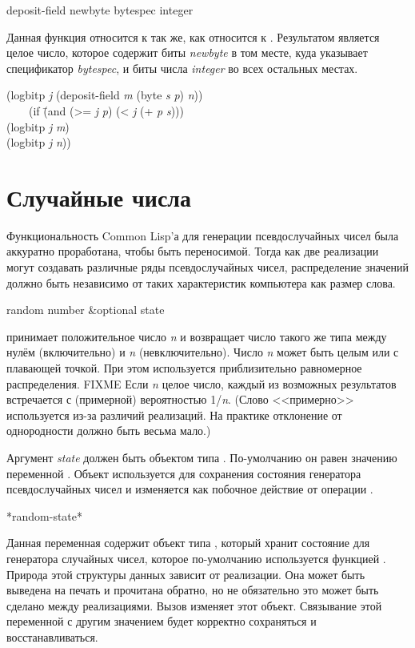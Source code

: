 \begin{defun}[Функция]
deposit-field newbyte bytespec integer

Данная функция относится к  так же, как  относится к
.
Результатом является целое число, которое содержит биты \emph{newbyte} в том
месте, куда указывает спецификатор \emph{bytespec}, и биты числа \emph{integer}
во всех остальных местах.
\begin{lisp}
(logbitp \emph{j} (deposit-field \emph{m} (byte \emph{s} \emph{p}) \emph{n})) \\
~~~\EQ\ (if \=(and (>= \emph{j} \emph{p}) (< \emph{j} (+ \emph{p} \emph{s}))) \\
\>(logbitp \emph{j} \emph{m}) \\
\>(logbitp \emph{j} \emph{n}))
\end{lisp}
\end{defun}

\section{Случайные числа}
\label{RANDOM}

Функциональность Common Lisp'а для генерации псевдослучайных чисел была
аккуратно проработана, чтобы быть переносимой. Тогда как две реализации могут
создавать различные ряды псевдослучайных чисел, распределение значений должно
быть независимо от таких характеристик компьютера как размер слова.

\begin{defun}[Функция]
random number &optional state

 принимает положительное число \emph{n} и возвращает число
такого же типа между нулём (включительно) и \emph{n} (невключительно).
Число \emph{n} может быть целым или с плавающей точкой.
При этом используется приблизительно равномерное распределения. FIXME
Если \emph{n} целое число, каждый из возможных результатов встречается с
(примерной) вероятностью 1/\emph{n}.
(Слово <<примерно>> используется из-за различий реализаций. На практике отклонение
от однородности должно быть весьма мало.)

Аргумент \emph{state} должен быть объектом типа .
По-умолчанию он равен значению переменной .
Объект используется для сохранения состояния генератора псевдослучайных чисел и
изменяется как побочное действие от операции .
\end{defun}

\begin{defun}[Переменная]
*random-state*

Данная переменная содержит объект типа , который хранит
состояние для генератора случайных чисел, которое по-умолчанию используется 
функцией .
Природа этой структуры данных зависит от реализации. Она может быть выведена на
печать и прочитана обратно, но не обязательно это может быть сделано между
реализациями.
Вызов  изменяет этот объект.
Связывание этой переменной с другим значением будет корректно сохраняться и
восстанавливаться.
\end{defun}

